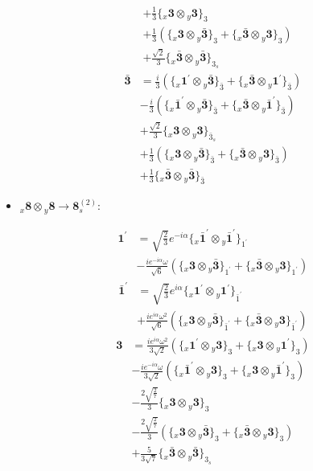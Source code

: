 \documentclass[english]{article}
\newcommand{\rep}[1]{\mathbf{#1}}
\newcommand{\repx}[2]{{}_{#2}\mathbf{#1}}
\newcommand{\tsprodx}[2]{\repx{#1}{x}\otimes\repx{#2}{y}}
\newcommand{\subcgt}[3]{\big\{ \tsprodx{#1}{#2}\big\}^{}_{#3}}
\begin{document}
\begin{itemize}
\begin{fleqn}
\begin{align*}
 & +\frac{1}{3}\subcgt{3}{3}{3} \\ 
 & +\frac{1}{3}\left(\subcgt{3}{\bar{3}}{3}+\subcgt{\bar{3}}{3}{3}\right) \\ 
 & +\frac{\sqrt{2}}{3}\subcgt{\bar{3}}{\bar{3}}{3_{s}}
\end{align*}
\begin{align*}
\rep{\bar{3}} & = \frac{i}{3}\left(\subcgt{1^{\prime}}{\bar{3}}{\bar{3}}+\subcgt{\bar{3}}{1^{\prime}}{\bar{3}}\right) \\ 
 & -\frac{i}{3}\left(\subcgt{\bar{1}^{\prime}}{\bar{3}}{\bar{3}}+\subcgt{\bar{3}}{\bar{1}^{\prime}}{\bar{3}}\right) \\ 
 & +\frac{\sqrt{2}}{3}\subcgt{3}{3}{\bar{3}_{s}} \\ 
 & +\frac{1}{3}\left(\subcgt{3}{\bar{3}}{\bar{3}}+\subcgt{\bar{3}}{3}{\bar{3}}\right) \\ 
 & +\frac{1}{3}\subcgt{\bar{3}}{\bar{3}}{\bar{3}}
\end{align*}
\end{fleqn}
\item $\tsprodx{8}{8}\to\rep{8}_{s}^{(2)}$:
\begin{fleqn}
\begin{align*}
\rep{1^{\prime}} & = \sqrt{\frac{2}{3}} e^{-i \alpha }\subcgt{\bar{1}^{\prime}}{\bar{1}^{\prime}}{1^{\prime}} \\ 
 & -\frac{i e^{-i \alpha } \omega }{\sqrt{6}}\left(\subcgt{3}{\bar{3}}{1^{\prime}}+\subcgt{\bar{3}}{3}{1^{\prime}}\right)
\end{align*}
\begin{align*}
\rep{\bar{1}^{\prime}} & = \sqrt{\frac{2}{3}} e^{i \alpha }\subcgt{1^{\prime}}{1^{\prime}}{\bar{1}^{\prime}} \\ 
 & +\frac{i e^{i \alpha } \omega ^2}{\sqrt{6}}\left(\subcgt{3}{\bar{3}}{\bar{1}^{\prime}}+\subcgt{\bar{3}}{3}{\bar{1}^{\prime}}\right)
\end{align*}
\begin{align*}
\rep{3} & = \frac{i e^{i \alpha } \omega ^2}{3 \sqrt{2}}\left(\subcgt{1^{\prime}}{3}{3}+\subcgt{3}{1^{\prime}}{3}\right) \\ 
 & -\frac{i e^{-i \alpha } \omega }{3 \sqrt{2}}\left(\subcgt{\bar{1}^{\prime}}{3}{3}+\subcgt{3}{\bar{1}^{\prime}}{3}\right) \\ 
 & -\frac{2 \sqrt{\frac{2}{7}}}{3}\subcgt{3}{3}{3} \\ 
 & -\frac{2 \sqrt{\frac{2}{7}}}{3}\left(\subcgt{3}{\bar{3}}{3}+\subcgt{\bar{3}}{3}{3}\right) \\ 
 & +\frac{5}{3 \sqrt{7}}\subcgt{\bar{3}}{\bar{3}}{3_{s}}

\end{align*}
\end{fleqn}
\end{itemize}
\end{document}
